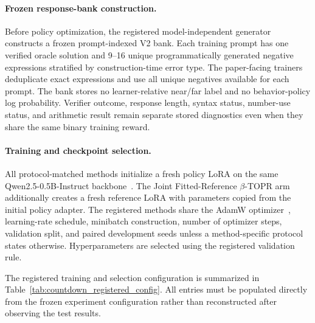 \documentclass[sigconf,anonymous,review]{acmart}
\theoremstyle{acmdefinition}
\begin{document}
\paragraph{Frozen response-bank construction.}

Before policy optimization, the registered model-independent generator
constructs a frozen prompt-indexed V2 bank. Each training prompt has one
verified oracle solution and 9--16 unique programmatically generated
negative expressions stratified by construction-time error type. The
paper-facing trainers deduplicate exact expressions and use all unique
negatives available for each prompt. The bank stores no learner-relative
near/far label and no behavior-policy log probability. Verifier outcome,
response length, syntax status, number-use status, and arithmetic result
remain separate stored diagnostics even when they share the same binary
training reward.

\paragraph{Training and checkpoint selection.}

All protocol-matched methods initialize a fresh policy LoRA on the same
Qwen2.5-0.5B-Instruct backbone~\citep{qwen2024qwen25}. The Joint
Fitted-Reference \(\beta\)-TOPR arm additionally creates a fresh
reference LoRA with parameters copied from the initial policy adapter.
The registered methods share the AdamW
optimizer~\citep{loshchilov2019decoupled}, learning-rate schedule,
minibatch construction, number of optimizer steps, validation split,
and paired development seeds unless a method-specific protocol states
otherwise. Hyperparameters are selected using the registered validation
rule.

The registered training and selection configuration is summarized in
Table~\ref{tab:countdown_registered_config}. All entries must be
populated directly from the frozen experiment configuration rather than
reconstructed after observing the test results.
\end{document}
